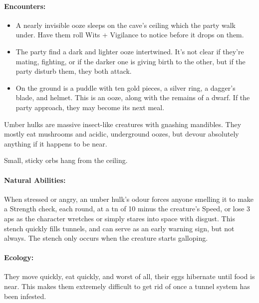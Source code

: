 \begin{multicols}{2}
\paragraph{Encounters:}

\begin{itemize}

  \item
  A nearly invisible ooze sleeps on the cave's ceiling which the party walk under.
  Have them roll Wits + Vigilance to notice before it drops on them.
  \item
  The party find a dark and lighter ooze intertwined.
  It's not clear if they're mating, fighting, or if the darker one is giving birth to the other, but if the party disturb them, they both attack.
  \item
  On the ground is a puddle with ten gold pieces, a silver ring, a dagger's blade, and helmet.
  This is an ooze, along with the remains of a dwarf.
  If the party approach, they may become its next meal.

\end{itemize}

\jelly

\label{umber_hulk}

Umber hulks are massive insect-like creatures with gnashing mandibles.
They mostly eat mushrooms and acidic, underground oozes, but devour absolutely anything if it happens to be near.

\begin{boxtext}

  Small, sticky orbs hang from the ceiling.

\end{boxtext}

\paragraph{Natural Abilities:} When stressed or angry, an umber hulk's odour forces anyone smelling it to make a Strength check, each round, at a \gls{tn} of 10 minus the creature's Speed, or lose 3 \glspl{ap} as the character wretches or simply stares into space with disgust.
This stench quickly fills tunnels, and can serve as an early warning sign, but not always.
The stench only occurs when the creature starts galloping.

\paragraph{Ecology:}
They move quickly, eat quickly, and worst of all, their eggs hibernate until food is near.
This makes them extremely difficult to get rid of once a tunnel system has been infested.


\end{multicols}
